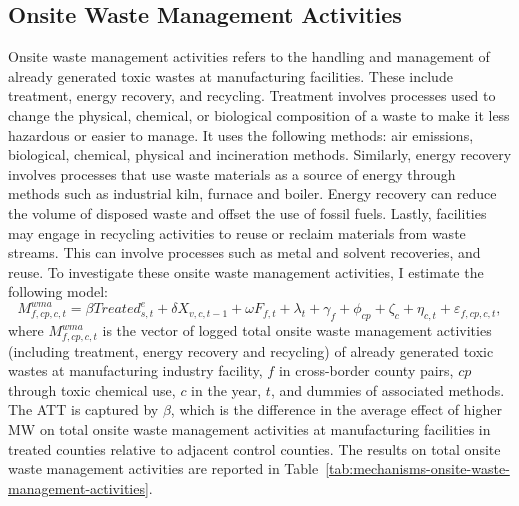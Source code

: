 \documentclass[12pt, english]{article}
\begin{document}
    \subsection{Onsite Waste Management Activities}\label{subsec:onsite-waste-management-activities}
    Onsite waste management activities refers to the handling and management of already generated toxic wastes at manufacturing facilities. These include treatment, energy recovery, and recycling. Treatment involves processes used to change the physical, chemical, or biological composition of a waste to make it less hazardous or easier to manage. It uses the following methods: air emissions, biological, chemical, physical and incineration methods. Similarly, energy recovery involves processes that use waste materials as a source of energy through methods such as industrial kiln, furnace and boiler. Energy recovery can reduce the volume of disposed waste and offset the use of fossil fuels. Lastly, facilities may engage in recycling activities to reuse or reclaim materials from waste streams. This can involve processes such as metal and solvent recoveries, and reuse. To investigate these onsite waste management activities, I estimate the following model:
    \begin{equation}
        M_{f,cp,c,t}^{wma} = \beta Treated_{s,t}^e + \delta X_{v,c,t-1} + \omega F_{f,t} + \lambda_{t} + \gamma_{f} + \phi_{cp} + \zeta_{c} + \eta_{c,t} + \varepsilon_{f,cp,c,t},\label{eq:mechanisms-waste-management}
    \end{equation}
    where $M_{f,cp,c,t}^{wma}$ is the vector of logged total onsite waste management activities (including treatment, energy recovery and recycling) of already generated toxic wastes at manufacturing industry facility, $f$ in cross-border county pairs, $cp$ through toxic chemical use, $c$ in the year, $t$, and dummies of associated methods. The ATT is captured by $\beta$, which is the difference in the average effect of higher MW on total onsite waste management activities at manufacturing facilities in treated counties relative to adjacent control counties. The results on total onsite waste management activities are reported in Table~\ref{tab:mechanisms-onsite-waste-management-activities}.
    
\end{document}
